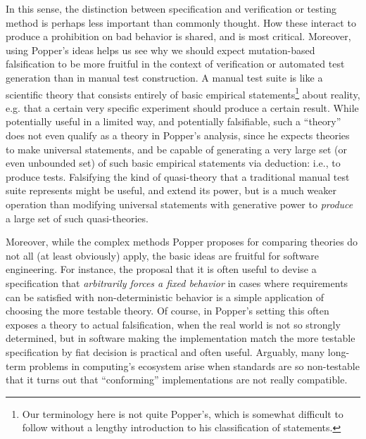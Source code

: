 \documentclass{svjour3}
\begin{document}
\noindent In this sense, the distinction between specification and
verification or testing method is perhaps less important than commonly
thought.  How these interact to produce a prohibition on bad behavior
is shared, and is most critical.  Moreover, using Popper's ideas helps
us see why we should expect mutation-based falsification to be more
fruitful in the context of verification or automated test generation
than in manual test construction.  A manual test suite is like a
scientific theory that consists entirely of basic empirical
statements\footnote{Our terminology here is not quite Popper's, which
  is somewhat difficult to follow without a lengthy introduction to
 his  classification of statements.} about
reality, e.g. that a certain very specific experiment should produce a certain
result.   While potentially useful in a limited way, and potentially falsifiable, such
a ``theory'' does not even qualify as a theory in Popper's analysis,
since he expects theories to make universal statements, and be capable
of generating a very large set (or even unbounded set) of such basic
empirical statements via deduction: i.e., to produce tests.  Falsifying the kind of quasi-theory
that a traditional manual test suite represents might be useful, and
extend its power, but is a much weaker operation than modifying
universal statements with generative power to \emph{produce} a large
set of such quasi-theories.

Moreover, while the complex methods Popper proposes for comparing
theories do not all (at least obviously)
apply, the basic ideas are fruitful for software engineering.  For
instance, the proposal that it is often useful to devise a specification that \emph{arbitrarily
forces a fixed behavior} in cases where requirements can be
satisfied with non-deterministic behavior \cite{ICSEDiff} is a simple
application of choosing the more testable theory.  Of course, in
Popper's setting this often exposes a theory to actual falsification,
when the real world is not so strongly determined, but in software
making the implementation match the more testable specification by fiat decision is
practical and often useful.  Arguably, many long-term problems in
computing's ecosystem arise when standards are so non-testable that it
turns out that ``conforming'' implementations are not really
compatible.
\end{document}

